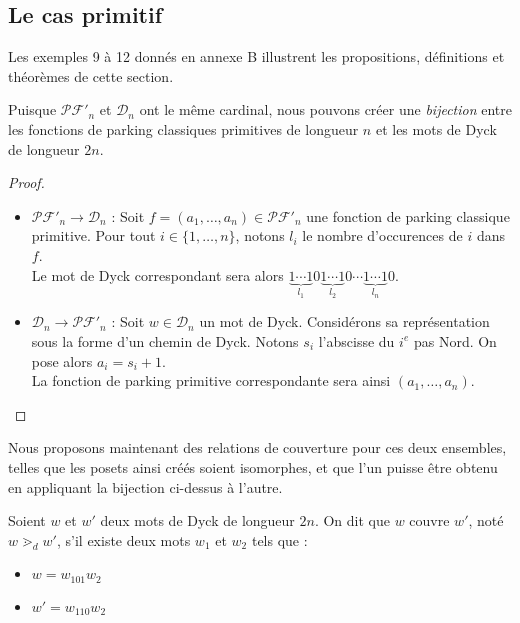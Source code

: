 \subsection{Le cas primitif}

Les exemples 9 à 12 donnés en annexe B illustrent les propositions,
définitions et théorèmes de cette section.

\begin{prop}
    Puisque $\mathcal{PF'}_n$ et $\mathcal{D}_n$ ont le même cardinal,
    nous pouvons créer une \emph{bijection} entre les fonctions de parking
    classiques primitives de longueur $n$ et les mots de Dyck de
    longueur $2n$.
\end{prop}

\begin{proof}
    ~\
\begin{itemize}
    \item $\mathcal{PF'}_n \to \mathcal{D}_n$ :
    Soit $f = (a_1, \ldots, a_n) \in \mathcal{PF'}_n$
    une fonction de parking classique primitive.
    Pour tout $i \in \{1, \ldots, n\}$, notons $l_i$ le nombre
    d'occurences de $i$ dans $f$.\\
    Le mot de Dyck correspondant sera alors
    $\underbrace{1 \cdots 1}_{l_1}0
     \underbrace{1 \cdots 1}_{l_2}0 \cdots
     \underbrace{1 \cdots 1}_{l_n}0$.
    
    \item $\mathcal{D}_n \to \mathcal{PF'}_n$ :
    Soit $w \in \mathcal{D}_n$ un mot de Dyck. Considérons sa
    représentation sous la forme d'un chemin de Dyck.
    Notons $s_i$ l'abscisse du $i^{e}$ pas Nord.
    On pose alors $a_i = s_i + 1$.\\
    La fonction de parking primitive correspondante sera ainsi
    $(a_1, \ldots, a_n)$.
\end{itemize}
\end{proof}

Nous proposons maintenant des relations de couverture pour ces deux
ensembles, telles que les posets ainsi créés soient isomorphes, et que 
l'un puisse être obtenu en appliquant la bijection ci-dessus à l'autre.

\begin{definition}[$\gtrdot_d$]
    Soient $w$ et $w'$ deux mots de Dyck de longueur $2n$.
    On dit que $w$ couvre $w'$, noté $w \gtrdot_d w'$, s'il existe deux
    mots $w_1$ et $w_2$ tels que :
    \begin{itemize}
        \item $w = w_101w_2$
        \item $w' = w_110w_2$
    \end{itemize}  
\end{definition}

